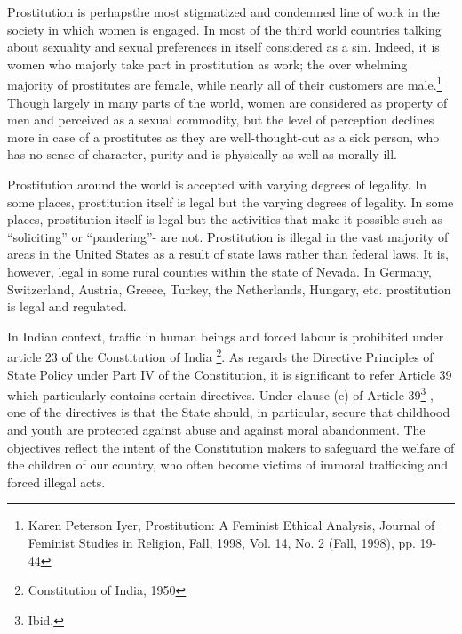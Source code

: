 \setcounter{figure}{0}
\setcounter{table}{0}
\setcounter{footnote}{0}

\label{2017-art3}

\begin{multicols}{2}


\noi
Prostitution is perhapsthe most stigmatized and condemned line of work in the society in which
women is engaged. In most of the third world countries talking about sexuality and sexual
preferences in itself considered as a sin. Indeed, it is women who majorly take part in
prostitution as work; the over whelming majority of prostitutes are female, while nearly all of
their customers are male.\footnote{Karen Peterson Iyer, Prostitution: A Feminist Ethical Analysis, Journal of Feminist Studies in Religion, Fall, 1998, Vol. 14, No. 2 (Fall, 1998), pp. 19-44} Though largely in many parts of the world, women are considered
as property of men and perceived as a sexual commodity, but the level of perception declines
more in case of a prostitutes as they are well-thought-out as a sick person, who has no sense of
character, purity and is physically as well as morally ill.

\noi
Prostitution around the world is accepted with varying degrees of legality. In some places,
prostitution itself is legal but the varying degrees of legality. In some places, prostitution itself
is legal but the activities that make it possible-such as “soliciting” or “pandering”- are not.
Prostitution is illegal in the vast majority of areas in the United States as a result of state laws
rather than federal laws. It is, however, legal in some rural counties within the state of Nevada.
In Germany, Switzerland, Austria, Greece, Turkey, the Netherlands, Hungary, etc. prostitution
is legal and regulated.

\noi
In Indian context, traffic in human beings and forced labour is prohibited under article 23 of
the Constitution of India \footnote{Constitution of India, 1950}. As regards the Directive Principles of State Policy under Part IV of
the Constitution, it is significant to refer Article 39 which particularly contains certain
directives. Under clause (e) of Article 39\footnote{Ibid.}
, one of the directives is that the State should, in
particular, secure that childhood and youth are protected against abuse and against moral
abandonment. The objectives reflect the intent of the Constitution makers to safeguard the
welfare of the children of our country, who often become victims of immoral trafficking and
forced illegal acts.


\end{multicols}
